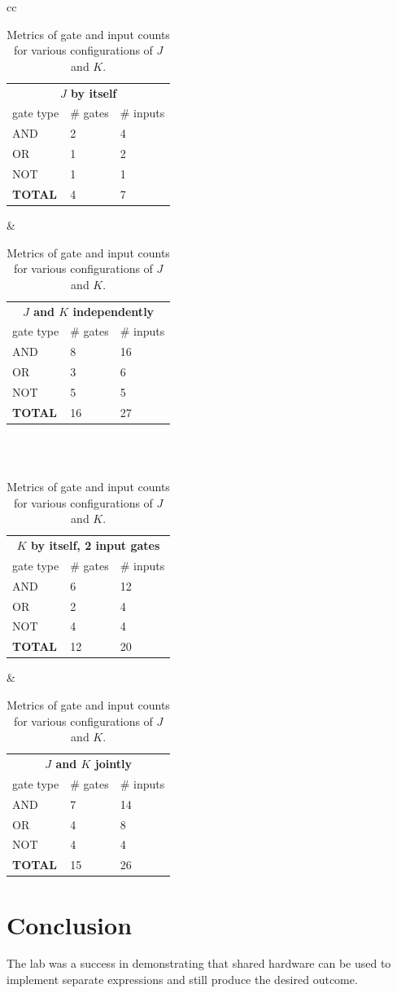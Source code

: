 \documentclass[12pt]{article}
\begin{document}
\begin{table}[!htb]
\center
\begin{tabular}{cc}
\begin{tabular}{lll}
\multicolumn{3}{c}{\bf{$J$ by itself}} \\
gate type & \# gates & \# inputs\\
\hline
AND & 2 & 4\\
OR & 1 & 2\\
NOT & 1 & 1 \\
\hline
\bf{TOTAL} & 4 & 7
\end{tabular}
&
\begin{tabular}{lll}
\multicolumn{3}{c}{\bf{$J$ and $K$ independently}} \\
gate type & \# gates & \# inputs\\
\hline
AND & 8 & 16 \\
OR & 3 & 6 \\
NOT & 5 & 5 \\
\hline
\bf{TOTAL} & 16 & 27
\end{tabular}
\\
\\
\begin{tabular}{lll}
\multicolumn{3}{c}{\bf{$K$ by itself, 2 input gates}} \\
gate type & \# gates & \# inputs\\
\hline
AND & 6 & 12 \\
OR & 2 & 4 \\
NOT & 4 & 4 \\
\hline
\bf{TOTAL} & 12 & 20
\end{tabular}
&
\begin{tabular}{lll}
\multicolumn{3}{c}{\bf{$J$ and $K$ jointly}} \\
gate type & \# gates & \# inputs\\
\hline
AND & 7 & 14 \\
OR & 4 & 8 \\
NOT & 4 & 4 \\
\hline
\bf{TOTAL} & 15 & 26
\end{tabular}
\end{tabular} %
\caption{Metrics of gate and input counts for various configurations
of $J$ and $K$.}
\label{tbl:counts}
\end{table}

\section{Conclusion}

The lab was a success in demonstrating that shared hardware can be used
to implement separate expressions and still produce the desired outcome.

%
%
\end{document}
